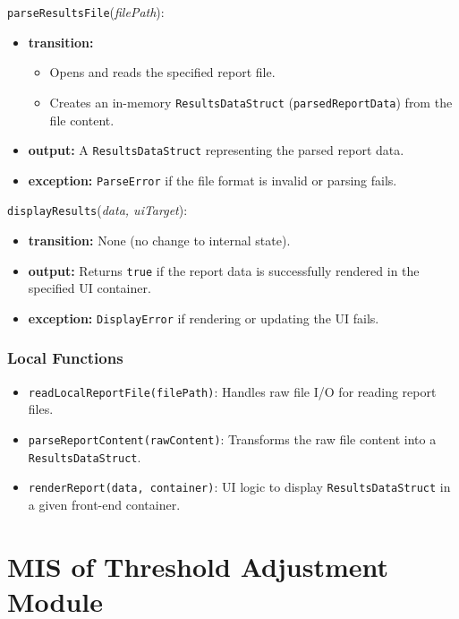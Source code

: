\documentclass[12pt, titlepage]{article}
\begin{document}
\noindent \texttt{parseResultsFile}(\textit{filePath}):
\begin{itemize}
    \item \textbf{transition:}
    \begin{itemize}
        \item Opens and reads the specified report file.
        \item Creates an in-memory \texttt{ResultsDataStruct} (\texttt{parsedReportData}) from the file content.
    \end{itemize}
    \item \textbf{output:} A \texttt{ResultsDataStruct} representing the parsed report data.
    \item \textbf{exception:} \texttt{ParseError} if the file format is invalid or parsing fails.
\end{itemize}

\noindent \texttt{displayResults}(\textit{data, uiTarget}):
\begin{itemize}
    \item \textbf{transition:} None (no change to internal state).
    \item \textbf{output:} Returns \texttt{true} if the report data is successfully rendered in the specified UI container.
    \item \textbf{exception:} \texttt{DisplayError} if rendering or updating the UI fails.
\end{itemize}

\subsubsection{Local Functions}

\begin{itemize}
    \item \texttt{readLocalReportFile(filePath)}: Handles raw file I/O for reading report files.
    \item \texttt{parseReportContent(rawContent)}: Transforms the raw file content into a \texttt{ResultsDataStruct}.
    \item \texttt{renderReport(data, container)}: UI logic to display \texttt{ResultsDataStruct} in a given front-end container.
\end{itemize}

\section{MIS of Threshold Adjustment Module} \label{mThreshold}
\end{document}

